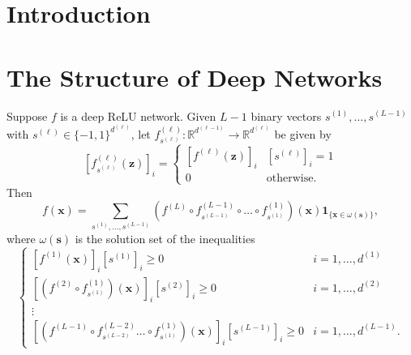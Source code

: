 \section{Introduction}


\section{The Structure of Deep Networks}

\begin{lemma}
    Suppose $f$ is a deep ReLU network. Given $L-1$ binary vectors $s^{(1)},\dots,s^{(L-1)}$ with $s^{(\ell)}\in\{-1,1\}^{d^{(\ell)}}$, let $f_{s^{(\ell)}}^{(\ell)}:\mathbb{R}^{d^{(\ell-1)}}\to\mathbb{R}^{d^{(\ell)}}$ be given by $$\left[f_{s^{(\ell)}}^{(\ell)}(\mathbf{z})\right]_i=\begin{cases}\left[f^{(\ell)}(\mathbf{z})\right]_i&\left[s^{(\ell)}\right]_i=1\\0&\text{otherwise.}\end{cases}$$Then$$f(\mathbf{x})=\sum_{s^{(1)},\dots,s^{(L-1)}}\left(f^{(L)}\circ f^{(L-1)}_{s^{(L-1)}}\circ\dots\circ f^{(1)}_{s^{(1)}}\right)(\mathbf{x})\mathbf{1}_{\{\mathbf{x}\in\omega(\mathbf{s})\}},$$where $\omega(\mathbf{s})$ is the solution set of the inequalities $$\begin{cases}\left[f^{(1)}(\mathbf{x})\right]_i\left[s^{(1)}\right]_i\geq0&i=1,\dots,d^{(1)}\\\left[\left(f^{(2)}\circ f^{(1)}_{s^{(1)}}\right)(\mathbf{x})\right]_i\left[s^{(2)}\right]_i\geq0&i=1,\dots,d^{(2)}\\\vdots\\\left[\left(f^{(L-1)}\circ f^{(L-2)}_{s^{(L-2)}}\dots\circ f^{(1)}_{s^{(1)}}\right)(\mathbf{x})\right]_i\left[s^{(L-1)}\right]_i\geq0&i=1,\dots,d^{(L-1)}.\end{cases}$$
\end{lemma}

